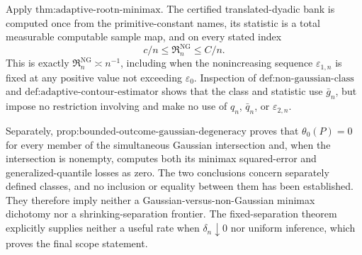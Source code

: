 Apply \(\text{thm:adaptive-rootn-minimax}\).  The certified translated-dyadic bank is computed once from the primitive-constant names, its statistic is a total measurable computable sample map, and on every stated index
\[
 c/n\le\mathfrak R_n^{\mathrm{NG}}\le C/n.
\]
This is exactly \(\mathfrak R_n^{\mathrm{NG}}\asymp n^{-1}\), including when the nonincreasing sequence \(\varepsilon_{1,n}\) is fixed at any positive value not exceeding \(\varepsilon_0\).  Inspection of \(\text{def:non-gaussian-class}\) and \(\text{def:adaptive-contour-estimator}\) shows that the class and statistic use \(\bar g_n\), but impose no restriction involving and make no use of \(\widehat q_n\), \(\bar q_n\), or \(\varepsilon_{2,n}\).

Separately, \(\text{prop:bounded-outcome-gaussian-degeneracy}\) proves that \(\theta_0(P)=0\) for every member of the simultaneous Gaussian intersection and, when the intersection is nonempty, computes both its minimax squared-error and generalized-quantile losses as zero.  The two conclusions concern separately defined classes, and no inclusion or equality between them has been established.  They therefore imply neither a Gaussian-versus-non-Gaussian minimax dichotomy nor a shrinking-separation frontier.  The fixed-separation theorem explicitly supplies neither a useful rate when \(\delta_n\downarrow0\) nor uniform inference, which proves the final scope statement.